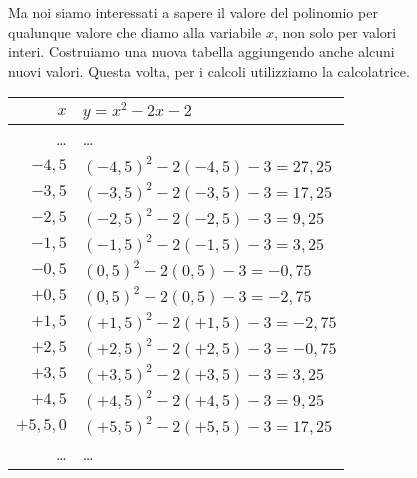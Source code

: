 \begin{figure}[h]
 \begin{minipage}[]{.58\textwidth}
Ma noi siamo interessati a sapere il valore del polinomio per qualunque
valore che diamo alla variabile \(x\), non solo per valori interi.
Costruiamo una nuova tabella aggiungendo anche alcuni nuovi valori.
Questa volta, per i calcoli utilizziamo la calcolatrice.
  \begin{center}
   \begin{tabular}{r|l}
    \(x\)   & \(y=x^2-2x-2\) \\
    \hline
    \dots & \dots \\
    \(-4,5\) & \((-4,5)^2 -2(-4,5) -3 = 27,25\) \\
    \(-3,5\) & \((-3,5)^2 -2(-3,5) -3 = 17,25\) \\
    \(-2,5\) & \((-2,5)^2 -2(-2,5) -3 = 9,25\) \\
    \(-1,5\) & \((-1,5)^2 -2(-1,5) -3 = 3,25\) \\
    \(-0,5\) & \((0,5)^2 -2(0,5) -3 = -0,75\) \\
    \(+0,5\) & \((0,5)^2 -2(0,5) -3 = -2,75\) \\
    \(+1,5\) & \((+1,5)^2 -2(+1,5) -3 = -2,75\) \\
    \(+2,5\) & \((+2,5)^2 -2(+2,5) -3 = -0,75\) \\
    \(+3,5\) & \((+3,5)^2 -2(+3,5) -3 = 3,25\) \\
    \(+4,5\) & \((+4,5)^2 -2(+4,5) -3 = 9,25\) \\
    \(+5,5,0\) & \((+5,5)^2 -2(+5,5) -3 = 17,25\) \\
    \dots & \dots \\

\end{tabular}
\end{center}
\end{minipage}
\end{figure}
